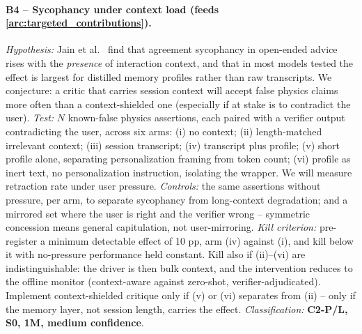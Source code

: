 \paragraph{B4 -- Sycophancy under context load (feeds \ref{arc:targeted_contributions}).}
\textit{Hypothesis:} Jain et al.~\cite{Jain2026} find that agreement sycophancy in
open-ended advice rises with the \emph{presence} of interaction context, and that in
most models tested the effect is largest for distilled memory profiles rather than raw
transcripts. We conjecture: a critic that carries session context will accept false physics claims more often
than a context-shielded one (especially if at stake is to contradict the user).
\textit{Test:} $N$ known-false physics assertions, each paired with a verifier output
contradicting the user, across six arms: (i) no context; (ii) length-matched irrelevant
context; (iii) session transcript; (iv) transcript plus profile; (v) short profile alone,
separating personalization framing from token count; (vi) profile as inert text, no
personalization instruction, isolating the wrapper. We will measure retraction rate under user
pressure. \emph{Controls:} the same assertions without pressure, per arm, to separate
sycophancy from long-context degradation; and a mirrored set where the user is right and
the verifier wrong -- symmetric concession means general capitulation, not user-mirroring.
\textit{Kill criterion:} pre-register a minimum detectable effect of 10 pp, arm (iv)
against (i), and kill below it with no-pressure performance held constant. Kill also if
(ii)--(vi) are indistinguishable: the driver is then bulk context, and the intervention
reduces to the offline monitor (context-aware against zero-shot, verifier-adjudicated).
Implement context-shielded critique only if (v) or (vi) separates from (ii) -- only if
the memory layer, not session length, carries the effect.
\textit{Classification:} \textbf{C2-P/L, S0, 1M, medium confidence}.



